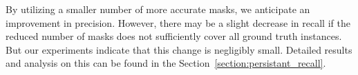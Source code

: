 By utilizing a smaller number of more accurate masks, we anticipate an improvement in precision. However, there may be a slight decrease in recall if the reduced number of masks does not sufficiently cover all ground truth instances. But our experiments indicate that this change is negligibly small. Detailed results and analysis on this can be found in the Section~\ref{section:persistant_recall}.



